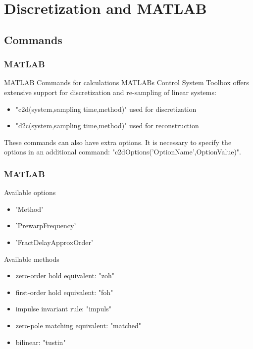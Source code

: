 \section{Discretization and MATLAB}
\subsection{Commands}
\begin{frame}
	\frametitle{MATLAB}
	\begin{block}{MATLAB Commands for calculations}
		MATLABs Control System Toolbox offers extensive support for discretization and re-sampling of linear systems:
	\begin{itemize}
		\item "c2d(system,sampling time,method)" used for discretization
		\item "d2c(system,sampling time,method)" used for reconstruction
	\end{itemize}
	\vspace{1em}
		These commands can also have extra options. It is necessary to specify the options in an additional command:
		"c2dOptions('OptionName',OptionValue)".
	\end{block}
\end{frame}

\begin{frame}
	\frametitle{MATLAB}
	\begin{block}{Available options}
		\begin{itemize}
			\item 'Method'
			\item 'PrewarpFrequency'
			\item 'FractDelayApproxOrder'
		\end{itemize}
	\end{block}
	\begin{block}{Available methods}
		\begin{itemize}
			\item zero-order hold equivalent: "zoh"
			\item first-order hold equivalent: "foh"
			\item impulse invariant rule: "impuls"
			\item zero-pole matching equivalent: "matched"
			\item bilinear: "tustin"
		\end{itemize}
	\end{block}
\end{frame}

